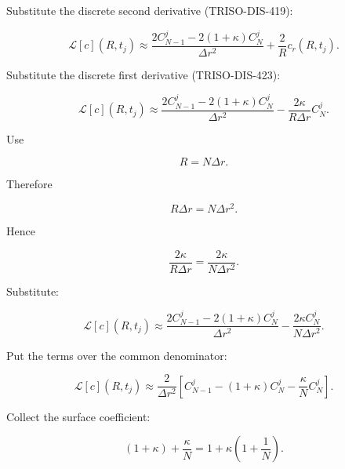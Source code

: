 \documentclass[11pt,a4paper]{article}
\begin{document}
Substitute the discrete second derivative (TRISO-DIS-419):

\begin{equation}
\mathcal L[c](R,t_j)
\approx
\frac{
2C_{N-1}^j
-
2(1+\kappa)C_N^j
}{
\Delta r^2
}
+
\frac2R c_r(R,t_j).
\tag{TRISO-DIS-426}
\label{eq:triso-dis-426}
\end{equation}

Substitute the discrete first derivative (TRISO-DIS-423):

\begin{equation}
\mathcal L[c](R,t_j)
\approx
\frac{
2C_{N-1}^j
-
2(1+\kappa)C_N^j
}{
\Delta r^2
}
-
\frac{2\kappa}{R\Delta r}C_N^j.
\tag{TRISO-DIS-427}
\label{eq:triso-dis-427}
\end{equation}

Use

\begin{equation}
R=N\Delta r.
\tag{TRISO-DIS-428}
\label{eq:triso-dis-428}
\end{equation}

Therefore

\begin{equation}
R\Delta r
=
N\Delta r^2.
\tag{TRISO-DIS-429}
\label{eq:triso-dis-429}
\end{equation}

Hence

\begin{equation}
\frac{2\kappa}{R\Delta r}
=
\frac{2\kappa}{N\Delta r^2}.
\tag{TRISO-DIS-430}
\label{eq:triso-dis-430}
\end{equation}

Substitute:

\begin{equation}
\mathcal L[c](R,t_j)
\approx
\frac{
2C_{N-1}^j
-
2(1+\kappa)C_N^j
}{
\Delta r^2
}
-
\frac{
2\kappa C_N^j
}{
N\Delta r^2
}.
\tag{TRISO-DIS-431}
\label{eq:triso-dis-431}
\end{equation}

Put the terms over the common denominator:

\begin{equation}
\mathcal L[c](R,t_j)
\approx
\frac2{\Delta r^2}
\left[
C_{N-1}^j
-
(1+\kappa)C_N^j
-
\frac{\kappa}{N}C_N^j
\right].
\tag{TRISO-DIS-432}
\label{eq:triso-dis-432}
\end{equation}

Collect the surface coefficient:

\begin{equation}
(1+\kappa)
+
\frac{\kappa}{N}
=
1+\kappa
\left(
1+\frac1N
\right).
\tag{TRISO-DIS-433}
\label{eq:triso-dis-433}
\end{equation}
\end{document}
